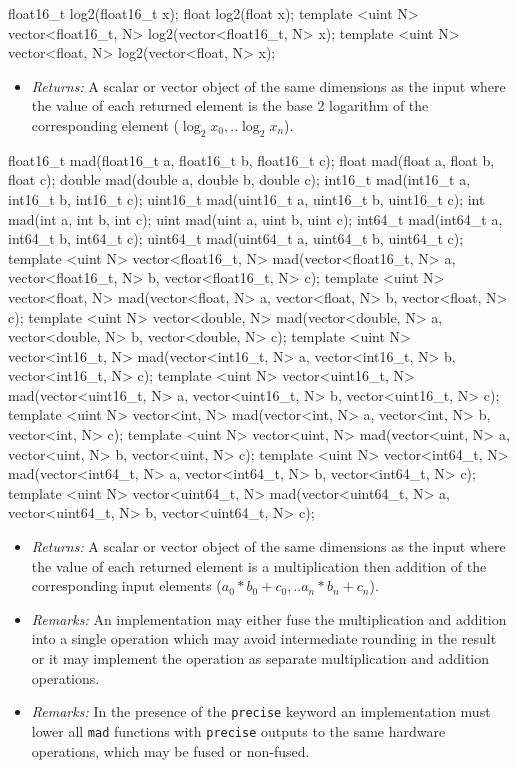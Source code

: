 \begin{HLSL}
float16_t log2(float16_t x);
float log2(float x);
template <uint N> vector<float16_t, N> log2(vector<float16_t, N> x);
template <uint N> vector<float, N> log2(vector<float, N> x);
\end{HLSL}

\begin{itemize}
  \item \textit{Returns:} A scalar or vector object of the same dimensions as
  the input where the value of each returned element is the base 2 logarithm
  of the corresponding element (\(\log_{2} x_0, .. \log_{2} x_n\)).
\end{itemize}

\begin{HLSL}
float16_t mad(float16_t a, float16_t b, float16_t c);
float mad(float a, float b, float c);
double mad(double a, double b, double c);
int16_t mad(int16_t a, int16_t b, int16_t c);
uint16_t mad(uint16_t a, uint16_t b, uint16_t c);
int mad(int a, int b, int c);
uint mad(uint a, uint b, uint c);
int64_t mad(int64_t a, int64_t b, int64_t c);
uint64_t mad(uint64_t a, uint64_t b, uint64_t c);
template <uint N>
vector<float16_t, N> mad(vector<float16_t, N> a, vector<float16_t, N> b,
                         vector<float16_t, N> c);
template <uint N>
vector<float, N> mad(vector<float, N> a, vector<float, N> b,
                     vector<float, N> c);
template <uint N>
vector<double, N> mad(vector<double, N> a, vector<double, N> b,
                      vector<double, N> c);
template <uint N>
vector<int16_t, N> mad(vector<int16_t, N> a, vector<int16_t, N> b,
                       vector<int16_t, N> c);
template <uint N>
vector<uint16_t, N> mad(vector<uint16_t, N> a, vector<uint16_t, N> b,
                        vector<uint16_t, N> c);
template <uint N>
vector<int, N> mad(vector<int, N> a, vector<int, N> b, vector<int, N> c);
template <uint N>
vector<uint, N> mad(vector<uint, N> a, vector<uint, N> b, vector<uint, N> c);
template <uint N>
vector<int64_t, N> mad(vector<int64_t, N> a, vector<int64_t, N> b,
                       vector<int64_t, N> c);
template <uint N>
vector<uint64_t, N> mad(vector<uint64_t, N> a, vector<uint64_t, N> b,
                        vector<uint64_t, N> c);
\end{HLSL}

\begin{itemize}
  \item \textit{Returns:} A scalar or vector object of the same dimensions as
  the input where the value of each returned element is a multiplication then
  addition of the corresponding input elements (\(a_0 * b_0 + c_0, .. a_n * b_n
  + c_n\)).
  \item \textit{Remarks:} An implementation may either fuse the multiplication
  and addition into a single operation which may avoid intermediate rounding
  in the result or it may implement the operation as separate multiplication and
  addition operations.
  \item \textit{Remarks:} In the presence of the \texttt{precise} keyword an
  implementation must lower all \texttt{mad} functions with \texttt{precise}
  outputs to the same hardware operations, which may be fused or
  non-fused.
\end{itemize}

